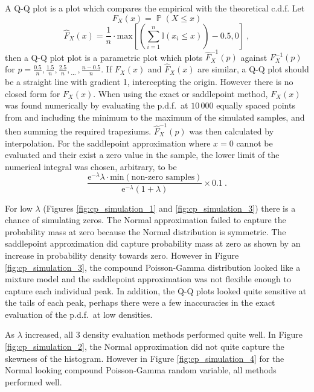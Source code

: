 \documentclass[12pt, a4paper]{memoir}
\DeclareMathOperator{\prob}{\mathbb{P}}
\newcommand{\euler}{\mathrm{e}}
\newcommand{\dotdotdot}{_{\phantom{.}\cdots}}
\begin{document}
A Q-Q plot is a plot which compares the empirical with the theoretical c.d.f. Let
\begin{equation}
	F_X(x) = \prob(X\leqslant x)
\end{equation}
\begin{equation}
	\widehat{F}_X(x) = \frac{1}{n}\cdot\text{max}
	\left[
		\left(\sum_{i=1}^n\mathbb{I}(x_i\leqslant x)\right)-0.5,0
	\right]
	\ ,
\end{equation}
then a Q-Q plot plot is a parametric plot which plots $\widehat{F}_X^{-1}(p)$ against $F_X^{-1}(p)$ for $p=\frac{0.5}{n},\frac{1.5}{n},\frac{2.5}{n},\dotdotdot,\frac{n-0.5}{n}$. If $F_X(x)$ and $\widehat{F}_X(x)$ are similar, a Q-Q plot should be a straight line with gradient 1, intercepting the origin. However there is no closed form for $F_X(x)$. When using the exact or saddlepoint method, $F_X(x)$ was found numerically by evaluating the p.d.f.~at $10\,000$ equally spaced points from and including the minimum to the maximum of the simulated samples, and then summing the required trapeziums. $\widehat{F}_X^{-1}(p)$ was then calculated by interpolation. For the saddlepoint approximation where $x=0$ cannot be evaluated and their exist a zero value in the sample, the lower limit of the numerical integral was chosen, arbitrary, to be
\begin{equation}
	\frac{
		\euler^{-\lambda}\lambda\cdot\text{min}\left(\text{non-zero samples}\right)
	}
	{
		\euler^{-\lambda}(1+\lambda)
	}
	\times 0.1
	\ .
\end{equation}

For low $\lambda$ (Figures \ref{fig:cp_simulation_1} and \ref{fig:cp_simulation_3}) there is a chance of simulating zeros. The Normal approximation failed to capture the probability mass at zero because the Normal distribution is symmetric. The saddlepoint approximation did capture probability mass at zero as shown by an increase in probability density towards zero. However in Figure \ref{fig:cp_simulation_3}, the compound Poisson-Gamma distribution looked like a mixture model and the saddlepoint approximation was not flexible enough to capture each individual peak. In addition, the Q-Q plots looked quite sensitive at the tails of each peak, perhaps there were a few inaccuracies in the exact evaluation of the p.d.f.~at low densities.

As $\lambda$ increased, all 3 density evaluation methods performed quite well. In Figure \ref{fig:cp_simulation_2}, the Normal approximation did not quite capture the skewness of the histogram. However in Figure \ref{fig:cp_simulation_4} for the Normal looking compound Poisson-Gamma random variable, all methods performed well.
\end{document}
